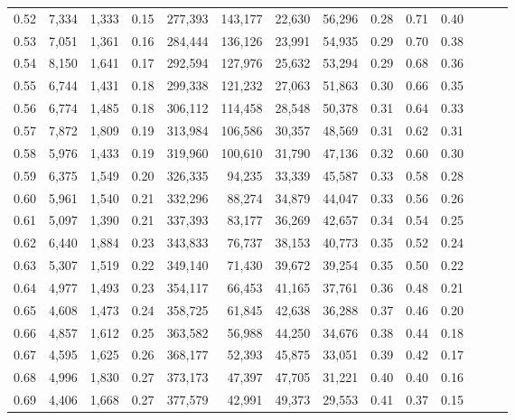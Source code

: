 \begin{tabular}{rrrrrrrrrrrrrr}
0.52 &   7,334 &  1,333 &  0.15 &  277,393 &  143,177 &  22,630 &  56,296 &  0.28 &  0.71 &      0.40 \\
0.53 &   7,051 &  1,361 &  0.16 &  284,444 &  136,126 &  23,991 &  54,935 &  0.29 &  0.70 &      0.38 \\
0.54 &   8,150 &  1,641 &  0.17 &  292,594 &  127,976 &  25,632 &  53,294 &  0.29 &  0.68 &      0.36 \\
0.55 &   6,744 &  1,431 &  0.18 &  299,338 &  121,232 &  27,063 &  51,863 &  0.30 &  0.66 &      0.35 \\
0.56 &   6,774 &  1,485 &  0.18 &  306,112 &  114,458 &  28,548 &  50,378 &  0.31 &  0.64 &      0.33 \\
0.57 &   7,872 &  1,809 &  0.19 &  313,984 &  106,586 &  30,357 &  48,569 &  0.31 &  0.62 &      0.31 \\
0.58 &   5,976 &  1,433 &  0.19 &  319,960 &  100,610 &  31,790 &  47,136 &  0.32 &  0.60 &      0.30 \\
0.59 &   6,375 &  1,549 &  0.20 &  326,335 &   94,235 &  33,339 &  45,587 &  0.33 &  0.58 &      0.28 \\
0.60 &   5,961 &  1,540 &  0.21 &  332,296 &   88,274 &  34,879 &  44,047 &  0.33 &  0.56 &      0.26 \\
0.61 &   5,097 &  1,390 &  0.21 &  337,393 &   83,177 &  36,269 &  42,657 &  0.34 &  0.54 &      0.25 \\
0.62 &   6,440 &  1,884 &  0.23 &  343,833 &   76,737 &  38,153 &  40,773 &  0.35 &  0.52 &      0.24 \\
0.63 &   5,307 &  1,519 &  0.22 &  349,140 &   71,430 &  39,672 &  39,254 &  0.35 &  0.50 &      0.22 \\
0.64 &   4,977 &  1,493 &  0.23 &  354,117 &   66,453 &  41,165 &  37,761 &  0.36 &  0.48 &      0.21 \\
0.65 &   4,608 &  1,473 &  0.24 &  358,725 &   61,845 &  42,638 &  36,288 &  0.37 &  0.46 &      0.20 \\
0.66 &   4,857 &  1,612 &  0.25 &  363,582 &   56,988 &  44,250 &  34,676 &  0.38 &  0.44 &      0.18 \\
0.67 &   4,595 &  1,625 &  0.26 &  368,177 &   52,393 &  45,875 &  33,051 &  0.39 &  0.42 &      0.17 \\
0.68 &   4,996 &  1,830 &  0.27 &  373,173 &   47,397 &  47,705 &  31,221 &  0.40 &  0.40 &      0.16 \\
0.69 &   4,406 &  1,668 &  0.27 &  377,579 &   42,991 &  49,373 &  29,553 &  0.41 &  0.37 &      0.15 \\

\end{tabular}
